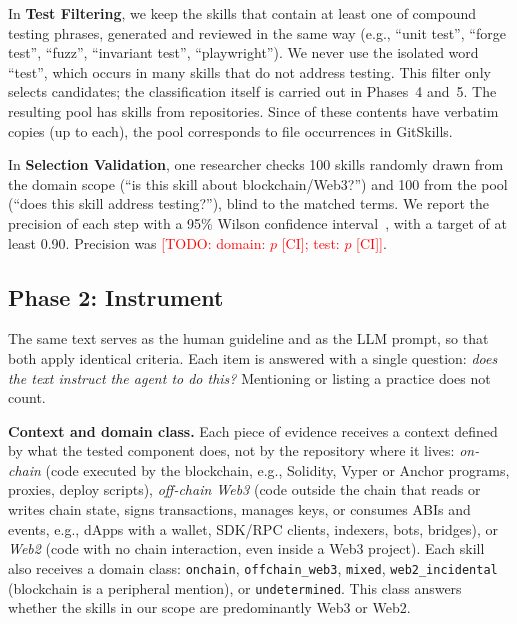 \documentclass[10pt,conference]{IEEEtran}
\newcommand{\todo}[1]{\textcolor{red}{[TODO: #1]}}
\begin{document}
In \textbf{Test Filtering}, we keep the skills that contain at least one of \NTestTerms compound testing phrases, generated and reviewed in the same way (e.g., ``unit test'', ``forge test'', ``fuzz'', ``invariant test'', ``playwright''). We never use the isolated word ``test'', which occurs in many skills that do not address testing. This filter only selects candidates; the classification itself is carried out in Phases~4 and~5. The resulting pool has \NPool skills from \NPoolRepos repositories. Since \NPoolWithCopies of these contents have verbatim copies (up to \NPoolMaxCopies each), the pool corresponds to \NPoolCopies file occurrences in GitSkills.

In \textbf{Selection Validation}, one researcher checks 100 skills randomly drawn from the domain scope (``is this skill about blockchain/Web3?'') and 100 from the pool (``does this skill address testing?''), blind to the matched terms. We report the precision of each step with a 95\% Wilson confidence interval~\cite{wilson1927}, with a target of at least 0.90. Precision was \todo{domain: $p$ [CI]; test: $p$ [CI]}.

\subsection{Phase 2: Instrument}
\label{sec:instrument}

The same text serves as the human guideline and as the LLM prompt, so that both apply identical criteria. Each item is answered with a single question: \textit{does the text instruct the agent to do this?} Mentioning or listing a practice does not count.

\textbf{Context and domain class.} Each piece of evidence receives a context defined by what the tested component does, not by the repository where it lives: \textit{on-chain} (code executed by the blockchain, e.g., Solidity, Vyper or Anchor programs, proxies, deploy scripts), \textit{off-chain Web3} (code outside the chain that reads or writes chain state, signs transactions, manages keys, or consumes ABIs and events, e.g., dApps with a wallet, SDK/RPC clients, indexers, bots, bridges), or \textit{Web2} (code with no chain interaction, even inside a Web3 project). Each skill also receives a domain class: \texttt{onchain}, \texttt{offchain\_web3}, \texttt{mixed}, \texttt{web2\_incidental} (blockchain is a peripheral mention), or \texttt{undetermined}. This class answers whether the skills in our scope are predominantly Web3 or Web2.
\end{document}
